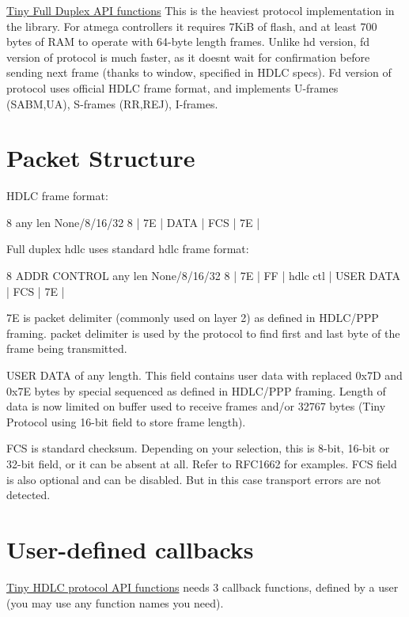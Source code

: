 \hyperlink{group__FULL__DUPLEX__API}{Tiny Full Duplex A\+PI functions} This is the heaviest protocol implementation in the library. For atmega controllers it requires 7\+KiB of flash, and at least 700 bytes of R\+AM to operate with 64-\/byte length frames. Unlike hd version, fd version of protocol is much faster, as it doesn\textquotesingle{}t wait for confirmation before sending next frame (thanks to window, specified in H\+D\+LC specs). Fd version of protocol uses official H\+D\+LC frame format, and implements U-\/frames (S\+A\+BM,UA), S-\/frames (RR,R\+EJ), I-\/frames.\hypertarget{index_packet}{}\section{Packet Structure}\label{index_packet}
H\+D\+LC frame format\+: 
\begin{DoxyPre}
     8        any len    None/8/16/32     8
 |   7E   |    DATA     |    FCS     |   7E   |
\end{DoxyPre}


Full duplex hdlc uses standard hdlc frame format\+: 
\begin{DoxyPre}
     8     ADDR  CONTROL     any len    None/8/16/32     8
 |   7E   | FF | hdlc ctl | USER DATA  |    FCS     |   7E   |
\end{DoxyPre}



\begin{DoxyItemize}
\item 7E is packet delimiter (commonly used on layer 2) as defined in H\+D\+L\+C/\+P\+PP framing. packet delimiter is used by the protocol to find first and last byte of the frame being transmitted.
\item U\+S\+ER D\+A\+TA of any length. This field contains user data with replaced 0x7D and 0x7E bytes by special sequenced as defined in H\+D\+L\+C/\+P\+PP framing. Length of data is now limited on buffer used to receive frames and/or 32767 bytes (Tiny Protocol using 16-\/bit field to store frame length).
\item F\+CS is standard checksum. Depending on your selection, this is 8-\/bit, 16-\/bit or 32-\/bit field, or it can be absent at all. Refer to R\+F\+C1662 for examples. F\+CS field is also optional and can be disabled. But in this case transport errors are not detected.
\end{DoxyItemize}\hypertarget{index_callback}{}\section{User-\/defined callbacks}\label{index_callback}
\hyperlink{group__HDLC__API}{Tiny H\+D\+LC protocol A\+PI functions} needs 3 callback functions, defined by a user (you may use any function names you need).

